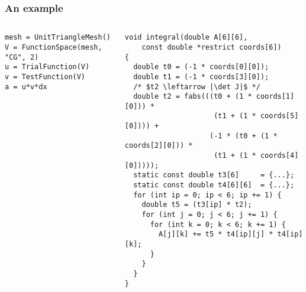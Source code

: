 \documentclass[presentation]{beamer}
\begin{document}
\begin{frame}[fragile]
  \frametitle{An example}
  \begin{columns}
    \begin{column}{0.5\textwidth}
\begin{verbatim}
mesh = UnitTriangleMesh()
V = FunctionSpace(mesh, "CG", 2)
u = TrialFunction(V)
v = TestFunction(V)
a = u*v*dx
\end{verbatim}
    \end{column}
\hspace{-3em}
    \begin{column}{0.65\textwidth}
\begin{verbatim}
void integral(double A[6][6], 
    const double *restrict coords[6])
{
  double t0 = (-1 * coords[0][0]);
  double t1 = (-1 * coords[3][0]);
  /* $t2 \leftarrow |\det J|$ */
  double t2 = fabs(((t0 + (1 * coords[1][0])) *
                     (t1 + (1 * coords[5][0]))) +
                    (-1 * (t0 + (1 * coords[2][0])) *
                     (t1 + (1 * coords[4][0]))));
  static const double t3[6]     = {...};
  static const double t4[6][6]  = {...};
  for (int ip = 0; ip < 6; ip += 1) {
    double t5 = (t3[ip] * t2);
    for (int j = 0; j < 6; j += 1) {
      for (int k = 0; k < 6; k += 1) {
        A[j][k] += t5 * t4[ip][j] * t4[ip][k];
      }
    }
  }
}
\end{verbatim}
    \end{column}
  \end{columns}
\end{frame}
\end{document}
